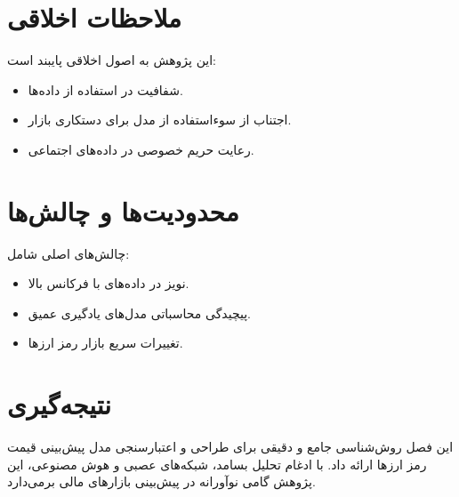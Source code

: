 \section{ملاحظات اخلاقی}
\label{sec:ethical_considerations}
این پژوهش به اصول اخلاقی پایبند است:
\begin{itemize}
	\item شفافیت در استفاده از داده‌ها.
	\item اجتناب از سوءاستفاده از مدل برای دستکاری بازار.
	\item رعایت حریم خصوصی در داده‌های اجتماعی.
\end{itemize}

\section{محدودیت‌ها و چالش‌ها}
\label{sec:limitations}
چالش‌های اصلی شامل:
\begin{itemize}
	\item نویز در داده‌های با فرکانس بالا.
	\item پیچیدگی محاسباتی مدل‌های یادگیری عمیق.
	\item تغییرات سریع بازار رمز ارزها.
\end{itemize}

\section{نتیجه‌گیری}
این فصل روش‌شناسی جامع و دقیقی برای طراحی و اعتبارسنجی مدل پیش‌بینی قیمت رمز ارزها ارائه داد. با ادغام تحلیل بسامد، شبکه‌های عصبی و هوش مصنوعی، این پژوهش گامی نوآورانه در پیش‌بینی بازارهای مالی برمی‌دارد.
